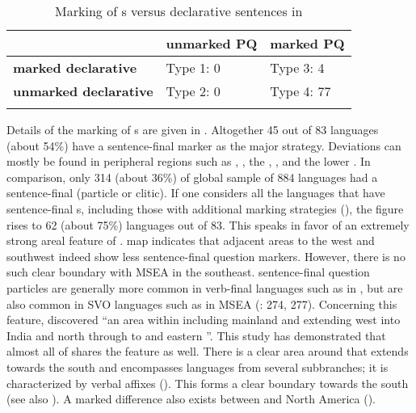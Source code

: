 \begin{table}
\caption{Marking of s versus declarative sentences in }
\label{tab:6:1}

\begin{tabularx}{\textwidth}{XXl}
\lsptoprule
& \textbf{unmarked PQ} & \textbf{marked PQ}\\
\midrule
\textbf{marked declarative} & Type 1: 0 & Type 3: 4\\
\textbf{unmarked declarative} & Type 2: 0 & Type 4: 77\\
\lspbottomrule
\end{tabularx}
\end{table}

\newpage
Details of the marking of s are given in . Altogether 45 out of 83 languages (about 54\%) have a sentence-final marker as the major  strategy. Deviations can mostly be found in peripheral regions such as , , the , , and the lower . In comparison, only 314 (about 36\%) of  global sample of 884 languages had a sentence-final  (particle or clitic). If one considers all the languages that have sentence-final s, including those with additional marking strategies (), the figure rises to 62 (about 75\%) languages out of 83. This speaks in favor of an extremely strong areal feature of .  map indicates that adjacent areas to the west and southwest indeed show less sentence-final question markers. However, there is no such clear boundary with MSEA in the southeast. sentence-final question particles are generally more common in verb-final languages such as in , but are also common in SVO languages such as in MSEA (\citealt{Dryer2013a}: 274, 277). Concerning this feature, \cite[Chapter Text]{Dryer2013k} discovered “an area within  including mainland  and extending west into India and north through  to  and eastern ”. This study has demonstrated that almost all of  shares the feature as well. There is a clear area around  that extends towards the south and encompasses  languages from several subbranches; it is characterized by verbal affixes (). This forms a clear boundary towards the south (see also ). A marked difference also exists between  and North America ().

